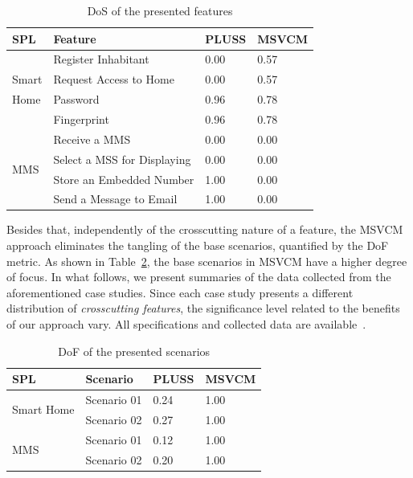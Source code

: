 {\begin{table}[thb]
\centering
\caption{DoS of the presented features}
\label{tab:feature-dos}
\begin{small}
\begin{tabular}{p{0.25in}lll} \hline
SPL							&	Feature						& PLUSS	& MSVCM	\\ \hline 
 							&	Register Inhabitant				& 0.00  & 0.57  \\
Smart						&	Request Access to Home			& 0.00  & 0.57  \\ 
Home						&	Password						& 0.96  & 0.78  \\ 
							&	Fingerprint					& 0.96  & 0.78  \\ \hline
\multirow{4}{*}{MMS}	 		&	Receive a MMS				& 0.00  & 0.00  \\ 
							&	Select a MSS for Displaying		& 0.00  & 0.00  \\ 
							& 	Store an Embedded Number		& 1.00  & 0.00  \\
							& 	Send a Message to Email			& 1.00  & 0.00  \\ \hline		
\end{tabular}
\end{small}
\end{table}

Besides that, independently of the crosscutting nature of a feature, the
MSVCM approach eliminates the tangling of the base scenarios, quantified by
the DoF metric. As shown in Table~\ref{tab:scenario-dof}, the base scenarios in
MSVCM have a higher degree of focus. 
In what follows, we present summaries of the data collected from the
aforementioned case studies. Since each case study presents a different distribution of
\emph{crosscutting features}, the significance level related to the benefits
of our approach vary. All specifications and collected data are available~\cite{SPG:site}.


\begin{table}[htb]
\centering
\caption{DoF of the presented scenarios}
\label{tab:scenario-dof}
\begin{small}
\begin{tabular}{llll} \hline
SPL							&	Scenario		& PLUSS	& MSVCM	\\ \hline
\multirow{2}{*}{Smart Home} &	Scenario 01		& 0.24  & 1.00  \\
							&	Scenario 02		& 0.27  & 1.00  \\ \hline
\multirow{2}{*}{MMS} 		&	Scenario 01		& 0.12  & 1.00  \\ 
							&	Scenario 02		& 0.20  & 1.00  \\ \hline
\end{tabular}
\end{small}
\end{table}

}


